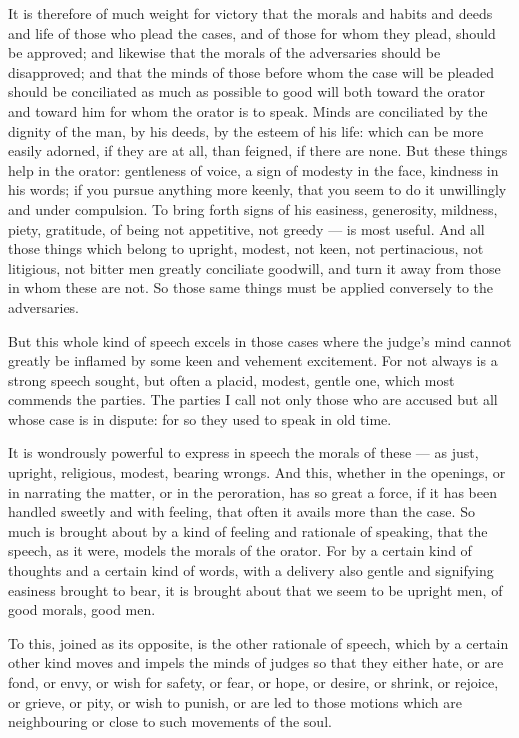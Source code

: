  It is therefore of much weight for victory that the morals and habits and deeds and life of those who plead the cases, and of those for whom they plead, should be approved; and likewise that the morals of the adversaries should be disapproved; and that the minds of those before whom the case will be pleaded should be conciliated as much as possible to good will both toward the orator and toward him for whom the orator is to speak. Minds are conciliated by the dignity of the man, by his deeds, by the esteem of his life: which can be more easily adorned, if they are at all, than feigned, if there are none. But these things help in the orator: gentleness of voice, a sign of modesty in the face, kindness in his words; if you pursue anything more keenly, that you seem to do it unwillingly and under compulsion. To bring forth signs of his easiness, generosity, mildness, piety, gratitude, of being not appetitive, not greedy — is most useful. And all those things which belong to upright, modest, not keen, not pertinacious, not litigious, not bitter men greatly conciliate goodwill, and turn it away from those in whom these are not. So those same things must be applied conversely to the adversaries.

 But this whole kind of speech excels in those cases where the judge's mind cannot greatly be inflamed by some keen and vehement excitement. For not always is a strong speech sought, but often a placid, modest, gentle one, which most commends the parties. The parties I call not only those who are accused but all whose case is in dispute: for so they used to speak in old time.

 It is wondrously powerful to express in speech the morals of these — as just, upright, religious, modest, bearing wrongs. And this, whether in the openings, or in narrating the matter, or in the peroration, has so great a force, if it has been handled sweetly and with feeling, that often it avails more than the case. So much is brought about by a kind of feeling and rationale of speaking, that the speech, as it were, models the morals of the orator. For by a certain kind of thoughts and a certain kind of words, with a delivery also gentle and signifying easiness brought to bear, it is brought about that we seem to be upright men, of good morals, good men.

 To this, joined as its opposite, is the other rationale of speech, which by a certain other kind moves and impels the minds of judges so that they either hate, or are fond, or envy, or wish for safety, or fear, or hope, or desire, or shrink, or rejoice, or grieve, or pity, or wish to punish, or are led to those motions which are neighbouring or close to such movements of the soul.

